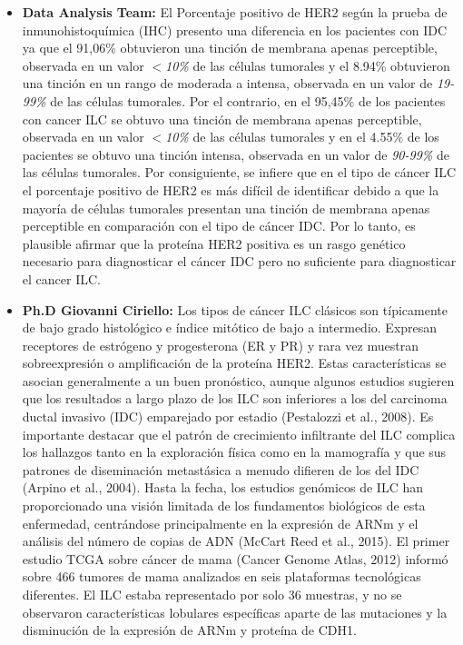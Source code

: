 \clearpage
{}

\begin{itemize}[label=\PencilRightDown]
	\item \textbf{Data Analysis Team:} El Porcentaje positivo de HER2 según la prueba de inmunohistoquímica (IHC) presento una diferencia en los pacientes con IDC ya que el 91,06\% obtuvieron una tinción de membrana apenas perceptible, observada en un valor $<$\textit{10\%} de las células tumorales y el 8.94\% obtuvieron una tinción en un rango de moderada a intensa, observada en un valor de \textit{19-99\%} de las células tumorales. Por el contrario, en el 95,45\% de los pacientes con cancer ILC se obtuvo una tinción de membrana apenas perceptible, observada en un valor $<$\textit{10\%} de las células tumorales y en el 4.55\% de los pacientes se obtuvo una tinción intensa, observada en un valor de \textit{90-99\%} de las células tumorales. Por consiguiente, se infiere que en el tipo de cáncer ILC el porcentaje positivo de HER2 es más difícil de identificar debido a que la mayoría de células tumorales presentan una tinción de membrana apenas perceptible en comparación con el tipo de cáncer IDC. Por lo tanto, es plausible afirmar que la proteína HER2 positiva es un rasgo genético necesario para diagnosticar el cáncer IDC pero no suficiente para diagnosticar el cancer ILC.
	
	\item \textbf{Ph.D Giovanni Ciriello:} Los tipos de cáncer ILC clásicos son típicamente de bajo grado histológico e índice mitótico de bajo a intermedio. Expresan receptores de estrógeno y progesterona (ER y PR) y rara vez muestran sobreexpresión o amplificación de la proteína HER2. Estas características se asocian generalmente a un buen pronóstico, aunque algunos estudios sugieren que los resultados a largo plazo de los ILC son inferiores a los del carcinoma ductal invasivo (IDC) emparejado por estadio (Pestalozzi et al., 2008). Es importante destacar que el patrón de crecimiento infiltrante del ILC complica los hallazgos tanto en la exploración física como en la mamografía y que sus patrones de diseminación metastásica a menudo difieren de los del IDC (Arpino et al., 2004). Hasta la fecha, los estudios genómicos de ILC han proporcionado una visión limitada de los fundamentos biológicos de esta enfermedad, centrándose principalmente en la expresión de ARNm y el análisis del número de copias de ADN (McCart Reed et al., 2015). El primer estudio TCGA sobre cáncer de mama (Cancer Genome Atlas, 2012) informó sobre 466 tumores de mama analizados en seis plataformas tecnológicas diferentes. El ILC estaba representado por solo 36 muestras, y no se observaron características lobulares específicas aparte de las mutaciones y la disminución de la expresión de ARNm y proteína de CDH1\cite{Ciriello2015}. 
	
\end{itemize}


